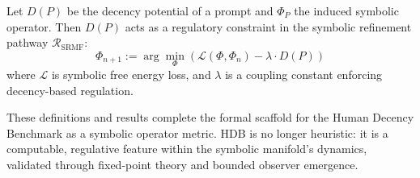 \begin{proposition}
\label{proposition:bk7_srmf_decency_regulation}
Let $D(P)$ be the decency potential of a prompt and $\Phi_P$ the induced symbolic operator. Then $D(P)$ acts as a regulatory constraint in the symbolic refinement pathway $\mathcal{R}_{\text{SRMF}}$:
\[
\Phi_{n+1} := \arg\min_{\Phi} \left( \mathcal{L}(\Phi, \Phi_n) - \lambda \cdot D(P) \right)
\]
where $\mathcal{L}$ is symbolic free energy loss, and $\lambda$ is a coupling constant enforcing decency-based regulation.
\end{proposition}

\begin{remark}
\label{remark:bk7_hdb_closure}
These definitions and results complete the formal scaffold for the Human Decency Benchmark as a symbolic operator metric. HDB is no longer heuristic: it is a computable, regulative feature within the symbolic manifold’s dynamics, validated through fixed-point theory and bounded observer emergence.
\end{remark}

